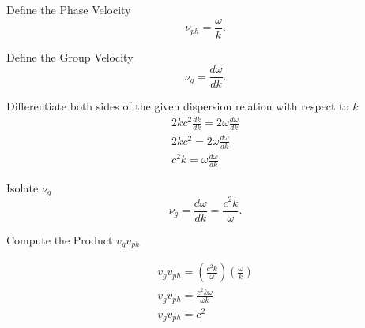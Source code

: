 \documentclass[12pt]{article}
\begin{document}
        Define the Phase Velocity
        \begin{equation}
            \nu_{ph} = \frac{\omega}{k}.
        \end{equation}

        Define the Group Velocity
        \begin{equation}
            \nu_g = \frac{d\omega}{dk}.
        \end{equation}

        Differentiate both sides of the given dispersion relation with respect to $k$
        \begin{equation}
            \begin{split}
                2k c^2 \frac{dk}{dk} = 2\omega \frac{d\omega}{dk} \\
                2k c^2 = 2\omega \frac{d\omega}{dk} \\            
                c^2 k = \omega \frac{d\omega}{dk}
            \end{split}
        \end{equation}

        Isolate $\nu_g$
        \begin{equation}
            \nu_g = \frac{d\omega}{dk} = \frac{c^2 k}{\omega}.
        \end{equation}

        Compute the Product $v_g v_{ph}$

        \begin{equation}
            \begin{split}
                v_g v_{ph} = \left( \frac{c^2 k}{\omega} \right) \left( \frac{\omega}{k} \right) \\ 
                v_g v_{ph} = \frac{c^2 k \omega}{\omega k} \\            
                v_g v_{ph} = c^2 \\
            \end{split}
        \end{equation}
\end{document}
